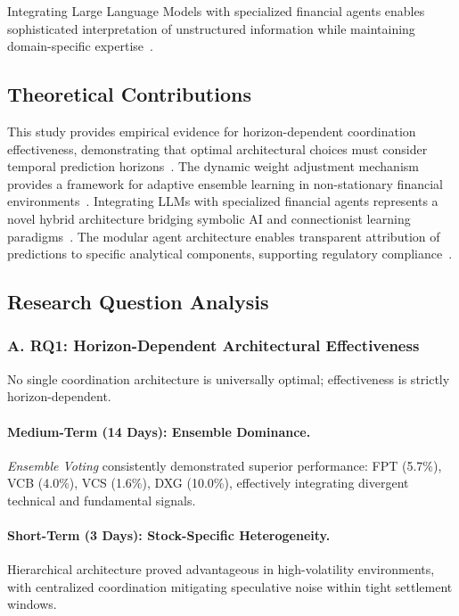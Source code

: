 \documentclass{ieeeaccess}
\begin{document}
Integrating Large Language Models with specialized financial agents enables sophisticated interpretation of unstructured information while maintaining domain-specific expertise~\cite{kenton2019bert,tetlock2007giving}.

\subsection{Theoretical Contributions}
This study provides empirical evidence for horizon-dependent coordination effectiveness, demonstrating that optimal architectural choices must consider temporal prediction horizons~\cite{hansen2001neural}. The dynamic weight adjustment mechanism provides a framework for adaptive ensemble learning in non-stationary financial environments~\cite{gama2014survey}. Integrating LLMs with specialized financial agents represents a novel hybrid architecture bridging symbolic AI and connectionist learning paradigms~\cite{bommasani2021foundation,brown2020language}. The modular agent architecture enables transparent attribution of predictions to specific analytical components, supporting regulatory compliance~\cite{arrieta2020explainable}.

\subsection{Research Question Analysis}

\subsubsection{A. RQ1: Horizon-Dependent Architectural Effectiveness}
No single coordination architecture is universally optimal; effectiveness is strictly horizon-dependent.

\paragraph{Medium-Term (14 Days): Ensemble Dominance.}
\textit{Ensemble Voting} consistently demonstrated superior performance: FPT (5.7\%), VCB (4.0\%), VCS (1.6\%), DXG (10.0\%), effectively integrating divergent technical and fundamental signals.

\paragraph{Short-Term (3 Days): Stock-Specific Heterogeneity.}
Hierarchical architecture proved advantageous in high-volatility environments, with centralized coordination mitigating speculative noise within tight settlement windows.
\end{document}
